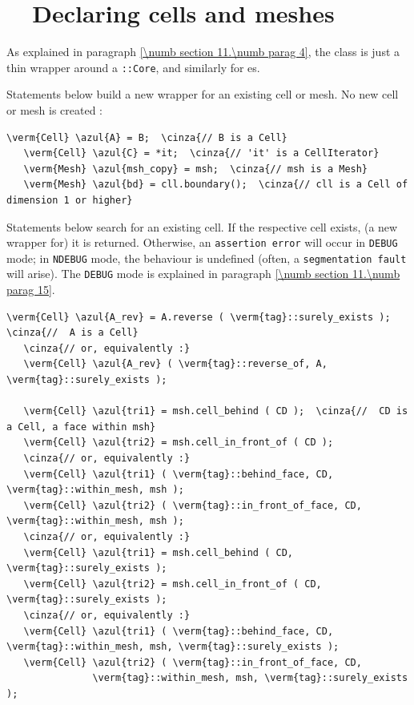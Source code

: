 \section{~~Declaring cells and meshes}\label{\numb section 9.\numb parag 10}

As explained in paragraph \ref{\numb section 11.\numb parag 4}, the {\small\tt {}} class
is just a thin wrapper around a {\small\tt {}::Core}, and similarly for {\small\tt {}}es.

Statements below build a new wrapper for an existing cell or mesh.
No new cell or mesh is created :

\begin{Verbatim}[commandchars=\\\{\},formatcom=\small\tt,
   baselinestretch=0.94,framesep=2mm                      ]
   \verm{Cell} \azul{A} = B;  \cinza{// B is a Cell}
   \verm{Cell} \azul{C} = *it;  \cinza{// 'it' is a CellIterator}
   \verm{Mesh} \azul{msh_copy} = msh;  \cinza{// msh is a Mesh}
   \verm{Mesh} \azul{bd} = cll.boundary();  \cinza{// cll is a Cell of dimension 1 or higher}
\end{Verbatim}

Statements below search for an existing cell.
If the respective cell exists, (a new wrapper for) it is returned.
Otherwise, an {\small\tt assertion error} will occur in {\small\tt DEBUG} mode;
in {\small\tt NDEBUG} mode, the behaviour is undefined (often, a {\small\tt segmentation fault}
will arise).
The {\small\tt DEBUG} mode is explained in paragraph \ref{\numb section 11.\numb parag 15}.

\begin{Verbatim}[commandchars=\\\{\},formatcom=\small\tt,
   baselinestretch=0.94,framesep=2mm                      ]
   \verm{Cell} \azul{A_rev} = A.reverse ( \verm{tag}::surely_exists );  \cinza{//  A is a Cell}
   \cinza{// or, equivalently :}
   \verm{Cell} \azul{A_rev} ( \verm{tag}::reverse_of, A, \verm{tag}::surely_exists );

   \verm{Cell} \azul{tri1} = msh.cell_behind ( CD );  \cinza{//  CD is a Cell, a face within msh}
   \verm{Cell} \azul{tri2} = msh.cell_in_front_of ( CD );
   \cinza{// or, equivalently :}
   \verm{Cell} \azul{tri1} ( \verm{tag}::behind_face, CD, \verm{tag}::within_mesh, msh );
   \verm{Cell} \azul{tri2} ( \verm{tag}::in_front_of_face, CD, \verm{tag}::within_mesh, msh );
   \cinza{// or, equivalently :}
   \verm{Cell} \azul{tri1} = msh.cell_behind ( CD, \verm{tag}::surely_exists );
   \verm{Cell} \azul{tri2} = msh.cell_in_front_of ( CD, \verm{tag}::surely_exists );
   \cinza{// or, equivalently :}
   \verm{Cell} \azul{tri1} ( \verm{tag}::behind_face, CD, \verm{tag}::within_mesh, msh, \verm{tag}::surely_exists );
   \verm{Cell} \azul{tri2} ( \verm{tag}::in_front_of_face, CD,
               \verm{tag}::within_mesh, msh, \verm{tag}::surely_exists );
\end{Verbatim}

